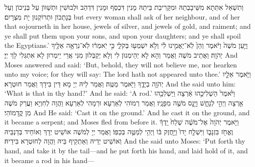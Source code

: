 {וְתִשְׁאַל אִתְּתָא מִשֵּׁיבָבְתַהּ וּמִקָּרִיבַת בֵּיתַהּ מָנִין דִּכְסַף וּמָנִין דִּדְהַב וּלְבוּשִׁין וּתְשַׁוּוֹן עַל בְּנֵיכוֹן וְעַל בְּנָתְכוֹן וּתְרוֹקְנוּן יָת מִצְרָיִם׃}
{but every woman shall ask of her neighbour, and of her that sojourneth in her house, jewels of silver, and jewels of gold, and raiment; and ye shall put them upon your sons, and upon your daughters; and ye shall spoil the Egyptians.’}{}
\newperek
{}%
{וַיַּ֤עַן מֹשֶׁה֙ וַיֹּ֔אמֶר וְהֵן֙ לֹֽא־יַאֲמִ֣ינוּ לִ֔י וְלֹ֥א יִשְׁמְע֖וּ בְּקֹלִ֑י כִּ֣י יֹֽאמְר֔וּ לֹֽא־נִרְאָ֥ה אֵלֶ֖יךָ יְהֹוָֽה׃}
{וַאֲתֵיב מֹשֶׁה וַאֲמַר וְהָא לָא יְהֵימְנוּן לִי וְלָא יְקַבְּלוּן מִנִּי אֲרֵי יֵימְרוּן לָא אִתְגְּלִי לָךְ יְיָ׃}
{And Moses answered and said: ‘But, behold, they will not believe me, nor hearken unto my voice; for they will say: The lord hath not appeared unto thee.’}{}
{וַיֹּ֧אמֶר אֵלָ֛יו יְהֹוָ֖ה  בְיָדֶ֑ךָ וַיֹּ֖אמֶר מַטֶּֽה׃
}
{וַאֲמַר לֵיהּ יְיָ מָא דֵּין בִּידָךְ וַאֲמַר חוּטְרָא׃}
{And the \lord\space said unto him: ‘What is that in thy hand?’ And he said: ‘A rod.’}{}
{וַיֹּ֙אמֶר֙ הַשְׁלִיכֵ֣הוּ אַ֔רְצָה וַיַּשְׁלִכֵ֥הוּ אַ֖רְצָה וַיְהִ֣י לְנָחָ֑שׁ וַיָּ֥נׇס מֹשֶׁ֖ה מִפָּנָֽיו׃
}
{וַאֲמַר רְמוֹהִי לְאַרְעָא וּרְמָהִי לְאַרְעָא וַהֲוָה לְחִוְיָא וַעֲרַק מֹשֶׁה מִן קֳדָמוֹהִי׃}
{And He said: ‘Cast it on the ground.’ And he cast it on the ground, and it became a serpent; and Moses fled from before it.}{}
{וַיֹּ֤אמֶר יְהֹוָה֙ אֶל־מֹשֶׁ֔ה שְׁלַח֙ יָֽדְךָ֔ וֶאֱחֹ֖ז בִּזְנָב֑וֹ וַיִּשְׁלַ֤ח יָדוֹ֙ וַיַּ֣חֲזֶק בּ֔וֹ וַיְהִ֥י לְמַטֶּ֖ה בְּכַפּֽוֹ׃
}
{וַאֲמַר יְיָ לְמֹשֶׁה אוֹשֵׁיט יְדָךְ וְאוֹחֵיד בְּדַנְבֵּיהּ וְאוֹשֵׁיט יְדֵיהּ וְאַתְקֵיף בֵּיהּ וַהֲוָה לְחוּטְרָא בִּידֵיהּ׃}
{And the \lord\space said unto Moses: ‘Put forth thy hand, and take it by the tail—and he put forth his hand, and laid hold of it, and it became a rod in his hand—}{}
